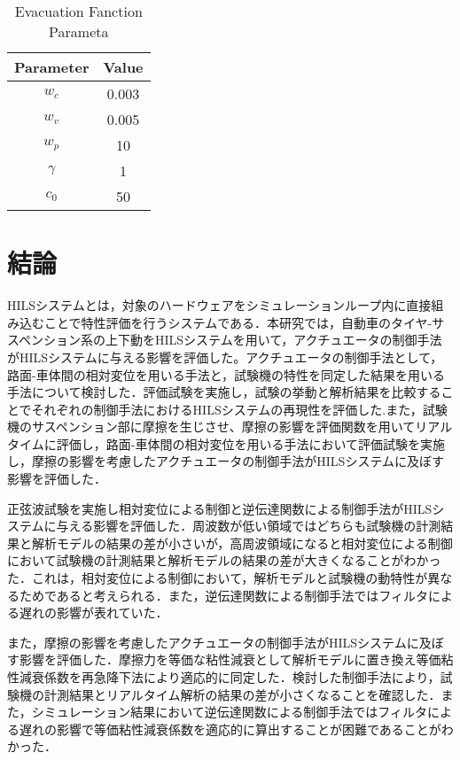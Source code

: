 \documentclass[a4paper,12pt]{article_vdlab_sotsuron}
\begin{document}
\vspace{10mm}
  \begin{table}[h!]
    \begin{center}
      \makeatletter
      \def\@captype{table}
      \makeatother
      \caption{Evacuation Fanction Parameta}
        \label{tab:HILS_w}
  	\begin{tabular}{cc}\hline
  	  Parameter & Value\\\hline
  	  $w_c$ & 0.003\\
  	  $w_v$  & 0.005\\
  	  $w_p$ & 10\\
  	  $\gamma$ & 1\\
  	  $c_0$ & 50\\\hline
        \end{tabular}
      \end{center}
  \end{table}

  \newpage
  \section{結論}
  HILSシステムとは，対象のハードウェアをシミュレーションループ内に直接組み込むことで特性評価を行うシステムである．本研究では，自動車のタイヤ-サスペンション系の上下動をHILSシステムを用いて，アクチュエータの制御手法がHILSシステムに与える影響を評価した。アクチュエータの制御手法として，路面-車体間の相対変位を用いる手法と，試験機の特性を同定した結果を用いる手法について検討した．評価試験を実施し，試験の挙動と解析結果を比較することでそれぞれの制御手法におけるHILSシステムの再現性を評価した.また，試験機のサスペンション部に摩擦を生じさせ、摩擦の影響を評価関数を用いてリアルタイムに評価し，路面-車体間の相対変位を用いる手法において評価試験を実施し，摩擦の影響を考慮したアクチュエータの制御手法がHILSシステムに及ぼす影響を評価した．\par
  正弦波試験を実施し相対変位による制御と逆伝達関数による制御手法がHILSシステムに与える影響を評価した．周波数が低い領域ではどちらも試験機の計測結果と解析モデルの結果の差が小さいが，高周波領域になると相対変位による制御において試験機の計測結果と解析モデルの結果の差が大きくなることがわかった．これは，相対変位による制御において，解析モデルと試験機の動特性が異なるためであると考えられる．また，逆伝達関数による制御手法ではフィルタによる遅れの影響が表れていた．\par
  また，摩擦の影響を考慮したアクチュエータの制御手法がHILSシステムに及ぼす影響を評価した．摩擦力を等価な粘性減衰として解析モデルに置き換え等価粘性減衰係数を再急降下法により適応的に同定した．検討した制御手法により，試験機の計測結果とリアルタイム解析の結果の差が小さくなることを確認した．また，シミュレーション結果において逆伝達関数による制御手法ではフィルタによる遅れの影響で等価粘性減衰係数を適応的に算出することが困難であることがわかった．
\newpage
\end{document}
